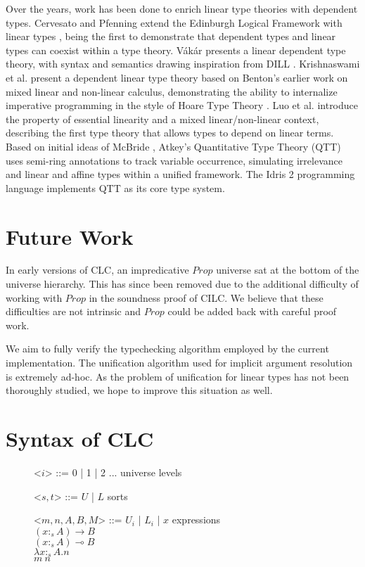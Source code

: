 \documentclass[sigplan,screen,review,anonymous]{acmart}
\newcommand{\indalt}[1][2]{\\\hspace*{-1.2em}\textbar\quad}
\begin{document}
Over the years, work has been done to enrich linear type theories with dependent types. Cervesato and Pfenning extend the Edinburgh Logical Framework with linear types \cite{lf,llf}, being the first to demonstrate that dependent types and linear types can coexist within a type theory. V\'{a}k\'{a}r \cite{vakar14} presents a linear dependent type theory, with syntax and semantics drawing inspiration from DILL \cite{dill}.  Krishnaswami et al. present a dependent linear type theory \cite{neel15} based on Benton's earlier work on mixed linear and non-linear calculus, demonstrating the ability to internalize imperative programming in the style of Hoare Type Theory \cite{htt}. Luo et al. \cite{luo} introduce the property of essential linearity and a mixed linear/non-linear context, describing the first type theory that allows types to depend on linear terms. Based on initial ideas of McBride \cite{nothing}, Atkey's Quantitative Type Theory (QTT) \cite{qtt} uses semi-ring annotations to track variable occurrence, simulating irrelevance and linear and affine types within a unified framework. The Idris 2 programming language \cite{idris2} implements QTT as its core type system.

\section{Future Work}
In early versions of CLC, an impredicative $Prop$ universe sat at the bottom of the universe hierarchy. This has since been removed due to the additional difficulty of working with $Prop$ in the soundness proof of CILC. We believe that these difficulties are not intrinsic and $Prop$ could be added back with careful proof work.

We aim to fully verify the typechecking algorithm employed by the current implementation. The unification algorithm used for implicit argument resolution is extremely ad-hoc. As the problem of unification for linear types has not been thoroughly studied, we hope to improve this situation as well.




\appendix

\section{Syntax of CLC}
\begin{figure}[H]
  \begin{grammar}
    <$i$> ::= 0 | 1 | 2 ... \phantom{* |} \hspace*{2.4em} universe levels

    <$s, t$> ::= $U$ | $L$ \phantom{| $x$} \hspace*{4.6em} sorts

    <$m, n, A, B, M$> ::= $U_i$ | $L_i$ | $x$ \hspace*{4em} expressions
    \indalt $(x :_s A) \rightarrow B$
    \indalt $(x :_s A) \multimap B$
    \indalt $\lambda x :_s A. n$
    \indalt $m\ n$
  \end{grammar}
  \Description{}
\end{figure}
\end{document}
